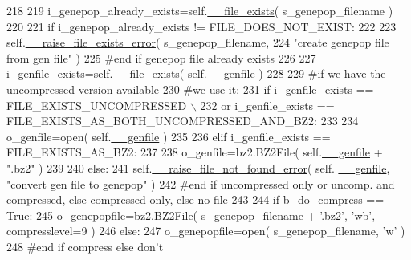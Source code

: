 \begin{DoxyCode}
218 
219         i\_genepop\_already\_exists=self.\hyperlink{classnegui_1_1pgoutputsimupop_1_1PGOutputSimuPop_a1fdfb988619bd4a9d377a1e20f52839c}{\_\_file\_exists}( s\_genepop\_filename )
220 
221         \textcolor{keywordflow}{if} i\_genepop\_already\_exists != FILE\_DOES\_NOT\_EXIST:
222 
223             self.\hyperlink{classnegui_1_1pgoutputsimupop_1_1PGOutputSimuPop_ad3f4c271b5b800d0137460e2349452e0}{\_\_raise\_file\_exists\_error}( s\_genepop\_filename, 
224                     \textcolor{stringliteral}{"create genepop file from gen file"} )
225         \textcolor{comment}{#end if genepop file already exists}
226 
227         i\_genfile\_exists=self.\hyperlink{classnegui_1_1pgoutputsimupop_1_1PGOutputSimuPop_a1fdfb988619bd4a9d377a1e20f52839c}{\_\_file\_exists}( self.\hyperlink{classnegui_1_1pgoutputsimupop_1_1PGOutputSimuPop_a30fb6b94af13efad6becfbe6fddc1d95}{\_\_genfile} )
228         
229         \textcolor{comment}{#if we have the uncompressed version available}
230         \textcolor{comment}{#we use it:}
231         \textcolor{keywordflow}{if} i\_genfile\_exists == FILE\_EXISTS\_UNCOMPRESSED \(\backslash\)
232             \textcolor{keywordflow}{or} i\_genfile\_exists == FILE\_EXISTS\_AS\_BOTH\_UNCOMPRESSED\_AND\_BZ2:
233 
234             o\_genfile=open( self.\hyperlink{classnegui_1_1pgoutputsimupop_1_1PGOutputSimuPop_a30fb6b94af13efad6becfbe6fddc1d95}{\_\_genfile} )
235 
236         \textcolor{keywordflow}{elif} i\_genfile\_exists == FILE\_EXISTS\_AS\_BZ2:
237 
238             o\_genfile=bz2.BZ2File( self.\hyperlink{classnegui_1_1pgoutputsimupop_1_1PGOutputSimuPop_a30fb6b94af13efad6becfbe6fddc1d95}{\_\_genfile} + \textcolor{stringliteral}{".bz2"} )
239 
240         \textcolor{keywordflow}{else}:
241             self.\hyperlink{classnegui_1_1pgoutputsimupop_1_1PGOutputSimuPop_abf6aab4f7982c2b0f9e4544343bf241b}{\_\_raise\_file\_not\_found\_error}( self.
      \hyperlink{classnegui_1_1pgoutputsimupop_1_1PGOutputSimuPop_a30fb6b94af13efad6becfbe6fddc1d95}{\_\_genfile}, \textcolor{stringliteral}{"convert gen file to genepop"} )
242         \textcolor{comment}{#end if uncompressed only or uncomp. and compressed, else compressed only, else no file}
243         
244         \textcolor{keywordflow}{if} b\_do\_compress == \textcolor{keyword}{True}:
245             o\_genepopfile=bz2.BZ2File( s\_genepop\_filename + \textcolor{stringliteral}{'.bz2'}, \textcolor{stringliteral}{'wb'}, compresslevel=9 ) 
246         \textcolor{keywordflow}{else}:
247             o\_genepopfile=open( s\_genepop\_filename, \textcolor{stringliteral}{'w'} )
248         \textcolor{comment}{#end if compress else don't}

\end{DoxyCode}
